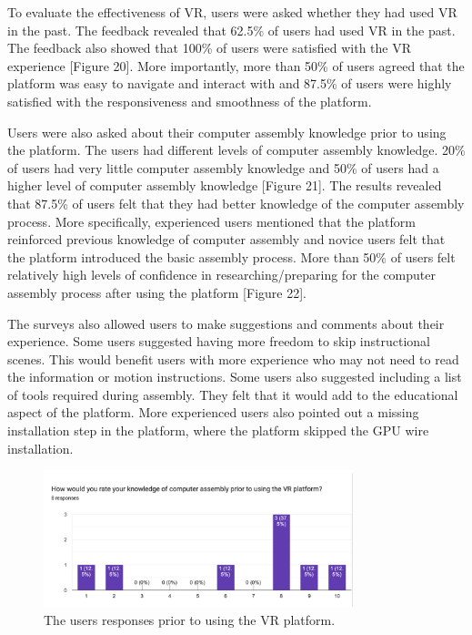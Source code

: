 \documentclass[10pt,twocolumn]{article}
\begin{document}
\par To evaluate the effectiveness of VR, users were asked whether they had used VR in the past. The feedback revealed that 62.5\% of users had used VR in the past. The feedback also showed that 100\% of users were satisfied with the VR experience [Figure 20]. More importantly, more than 50\% of users agreed that the platform was easy to navigate and interact with and 87.5\% of users were highly satisfied with the responsiveness and smoothness of the platform.  

\par Users were also asked about their computer assembly knowledge prior to using the platform. The users had different levels of computer assembly knowledge. 20\% of users had very little computer assembly knowledge and 50\% of users had a higher level of computer assembly knowledge [Figure 21]. The results revealed that 87.5\% of users felt that they had better knowledge of the computer assembly process. More specifically, experienced users mentioned that the platform reinforced previous knowledge of computer assembly and novice users felt that the platform introduced the basic assembly process. More than 50\% of users felt relatively high levels of confidence in researching/preparing for the computer assembly process after using the platform [Figure 22].

\par The surveys also allowed users to make suggestions and comments about their experience. Some users suggested having more freedom to skip instructional scenes. This would benefit users with more experience who may not need to read the information or motion instructions. Some users also suggested including a list of tools required during assembly. They felt that it would add to the educational aspect of the platform. More experienced users also pointed out a missing installation step in the platform, where the platform skipped the GPU wire installation. 

\begin{figure}
    \centering
    \includegraphics[width=9cm]{images/PriorVRKnowledge.png}
    \caption{The users responses prior to using the VR platform.}
\end{figure}
\end{document}

